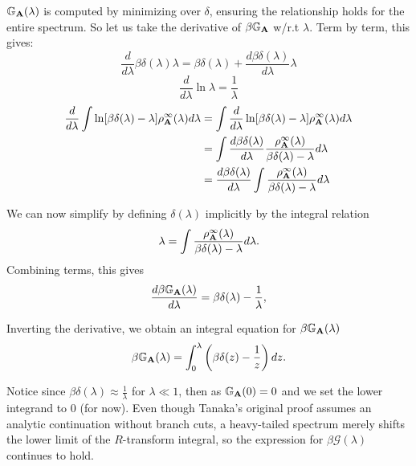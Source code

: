 $\mathbb{G}_{\mathbf{A}}(\lambda)$ is computed by minimizing over $\delta$, ensuring the relationship holds for the entire spectrum.
So let us take the derivative of $\beta\mathbb{G}_{\mathbf{A}}$ w/r.t $\lambda$. 
Term by term, this gives:
\begin{equation}
\dfrac{d}{d\lambda} \beta\delta(\lambda)\lambda = \beta\delta(\lambda) + \dfrac{d \beta\delta(\lambda)}{d\lambda} \lambda
\end{equation}
\begin{equation}
\dfrac{d}{d\lambda} \ln\lambda = \dfrac{1}{\lambda}
\end{equation}
\begin{align}
\dfrac{d}{d\lambda} \int \ln[\beta\delta(\lambda) - \lambda] \rho^{\infty}_{\mathbf{A}}(\lambda) d\lambda
&= \int \dfrac{d}{d\lambda} \ln[\beta\delta(\lambda) - \lambda] \rho^{\infty}_{\mathbf{A}}(\lambda) d\lambda \\ \nonumber
&= \int \dfrac{d \beta\delta(\lambda)}{d\lambda}\dfrac{ \rho^{\infty}_{\mathbf{A}}(\lambda)}{\beta\delta(\lambda) - \lambda}d\lambda  \\ \nonumber
&=  \dfrac{d \beta\delta(\lambda)}{d\lambda}\int\dfrac{ \rho^{\infty}_{\mathbf{A}}(\lambda)}{\beta\delta(\lambda) - \lambda}d\lambda
\end{align}

We can now simplify by  defining $\delta(\lambda)$ implicitly by the integral relation
\begin{equation}
\lambda = \int \frac{\rho^{\infty}_{\mathbf{A}}(\lambda)}{\beta\delta(\lambda) - \lambda} d\lambda.
\end{equation}
Combining terms, this gives
\begin{equation}
\frac{d\beta\mathbb{G}_{\mathbf{A}}(\lambda)}{d\lambda} = \beta\delta(\lambda) - \frac{1}{\lambda},
\end{equation}

 Inverting the derivative, we obtain an integral equation for $\beta\mathbb{G}_{\mathbf{A}}(\lambda)$ 
\begin{equation}
\beta\mathbb{G}_{\mathbf{A}}(\lambda) = \int_0^\lambda \left(\beta\delta(z) - \frac{1}{z}\right) dz.
\end{equation}

Notice since  $\beta\delta(\lambda) \approx \frac{1}{\lambda}$ for $\lambda \ll 1$, then
as $\mathbb{G}_{\mathbf{A}}(0) = 0$ and we set the lower integrand to $0$ (for now).  Even though Tanaka’s original proof assumes an analytic continuation without branch cuts, a heavy-tailed spectrum merely shifts the lower limit of the $R$-transform integral, so the expression for $\beta\mathcal G(\lambda)$ continues to hold.


